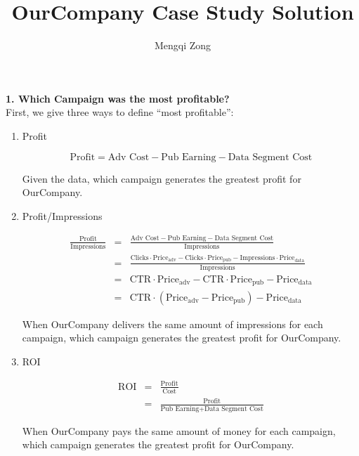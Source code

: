 \documentclass[12pt]{article}
\title{OurCompany Case Study Solution}
\author{Mengqi Zong}
\begin{document}
\maketitle

\setlength{\parindent}{0in}

{\bf 1. Which Campaign was the most profitable?} \\

First, we give three ways to define ``most profitable'':

\begin{enumerate}
\item Profit

	\begin{equation*}
		\text{Profit} = \text{Adv Cost} - \text{Pub Earning} - \text{Data Segment Cost}
	\end{equation*}

	Given the data, which campaign generates the greatest profit for OurCompany.

\item Profit/Impressions

	\begin{eqnarray*}
		\frac {\text{Profit}}{\text{Impressions}}
		&=& \frac {\text{Adv Cost} - \text{Pub Earning} - \text{Data Segment Cost}}{\text{Impressions}} \\
		&=& \frac {\text{Clicks} \cdot \text{Price}_{\text{adv}} - \text{Clicks} \cdot \text{Price}_{\text{pub}}  - \text{Impressions} \cdot \text{Price}_{\text{data}}}{\text{Impressions}} \\
		&=& \text{CTR} \cdot \text{Price}_{\text{adv}} - \text{CTR} \cdot \text{Price}_{\text{pub}} - \text{Price}_{\text{data}} \\
		&=& \text{CTR} \cdot (\text{Price}_{\text{adv}} - \text{Price}_{\text{pub}}) - \text{Price}_{\text{data}}
	\end{eqnarray*}

	When OurCompany delivers the same amount of impressions for each campaign, which campaign generates the greatest profit for OurCompany.
	
\item ROI

	\begin{eqnarray*}
		\text{ROI} &=& \frac {\text{Profit}} {\text{Cost}} \\
				   &=& \frac {\text{Profit}} {\text{Pub Earning} + \text{Data Segment Cost}}
	\end{eqnarray*}
	
	When OurCompany pays the same amount of money for each campaign, which campaign generates the greatest profit for OurCompany.
\end{enumerate}
\end{document}
